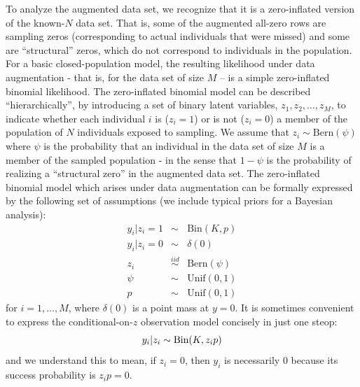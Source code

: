 To analyze the augmented data set, we recognize that it is a
zero-inflated version of the known-$N$ data set. That is, some of the
augmented all-zero rows are sampling zeros (corresponding to actual
individuals that were missed) and some are ``structural'' zeros, which
do not correspond to individuals in the population. For a basic
closed-population model, the resulting likelihood under data
augmentation - that is, for the data set of size $M$ -- is a simple
zero-inflated binomial likelihood.  The zero-inflated binomial model
can be described ``hierarchically'', by introducing a set of binary
latent variables, $z_{1},z_{2},\ldots, z_{M}$, to indicate whether
each individual $i$ is ($z_i=1$) or is not ($z_i=0$) a member of the
population of $N$ individuals exposed to sampling. We assume that
$z_{i} \sim \mbox{Bern}(\psi)$ where $\psi$ is the probability that an
individual in the data set of size $M$ is a member of the sampled
population - in the sense that $1-\psi$ is the probability of
realizing a ``structural zero'' in the augmented data set.  The
zero-inflated binomial model which arises under data augmentation can
be formally expressed by the following set of assumptions (we include
typical priors for a Bayesian analysis):
\begin{eqnarray*}
 y_{i}|{z_{i}=1} & \sim  &\mbox{Bin}(K, p) \\
 y_{i}|{z_{i}=0} & \sim &  \delta(0)  \\
 z_{i} & \stackrel{iid}{\sim} & \mbox{Bern}(\psi) \\
 \psi & \sim & \mathrm{Unif}(0,1) \\
 p & \sim & \mathrm{Unif}(0,1)
\end{eqnarray*}
for $i=1, \ldots, M$, where $\delta(0)$ is a point mass at
$y=0$. 
It is sometimes convenient to express the conditional-on-$z$
observation model concisely in
just one steop:
\[
 y_{i}|z_{i}  \sim  \mbox{Bin}(K, z_{i} p) \\
\]
and we understand this to mean, if $z_{i}=0$, then $y_{i}$ is
necessarily 0 because its success probability is $z_{i} p = 0$.

